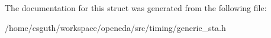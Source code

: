 The documentation for this struct was generated from the following file\-:\begin{DoxyCompactItemize}
\item 
/home/csguth/workspace/openeda/src/timing/generic\-\_\-sta.\-h\end{DoxyCompactItemize}
